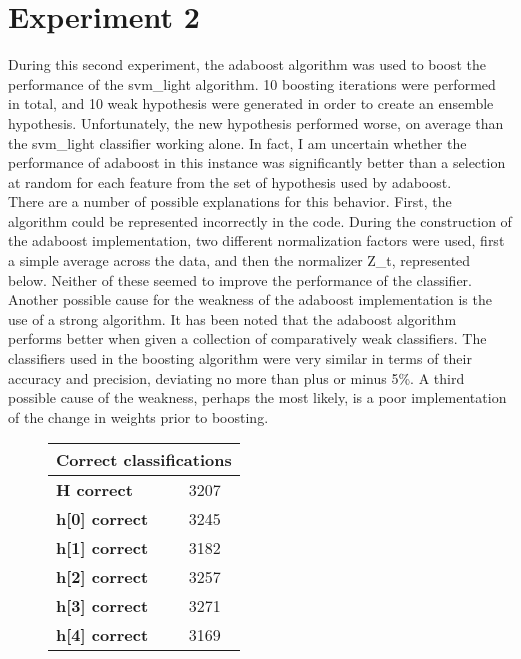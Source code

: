 \documentclass[titlepage,11pt]{article}
\begin{document}
\section[5]{Experiment 2} {
\vspace{2pt} \hspace{2pt}During this second experiment, the adaboost algorithm was used to boost the performance of the svm\_light algorithm. 10 boosting iterations were performed in total, and 10 weak hypothesis were generated in order to create an ensemble hypothesis. Unfortunately, the new hypothesis performed worse, on average than the svm\_light classifier working alone. In fact, I am uncertain whether the performance of adaboost in this instance was significantly better than a selection at random for each feature from the set of hypothesis used by adaboost. \\
\vspace{2pt} \hspace{2pt}There are a number of possible explanations for this behavior. First, the algorithm could be represented incorrectly in the code. During the construction of the adaboost implementation, two different normalization factors were used, first a simple average across the data, and then the normalizer Z\_t, represented below. Neither of these seemed to improve the performance of the classifier. Another possible cause for the weakness of the adaboost implementation is the use of a strong algorithm. It has been noted that the adaboost algorithm performs better when given a collection of comparatively weak classifiers. The classifiers used in the boosting algorithm were very similar in terms of their accuracy and precision, deviating no more than plus or minus 5\%. A third possible cause of the weakness, perhaps the most likely, is a poor implementation of the change in weights prior to boosting. \\
\vspace{0.5pt}
\begin{figure}[h]
\begin{tabular}{|l|l|}
\hline
\multicolumn{2}{|c|}{\textbf{Correct classifications}}\\
\hline
\textbf{ H correct } & 3207 \\
\textbf{ h[0] correct } & 3245 \\
\textbf{ h[1] correct } & 3182 \\
\textbf{ h[2] correct } & 3257 \\
\textbf{ h[3] correct } & 3271 \\
\textbf{ h[4] correct } & 3169 \\

\end{tabular}
\end{figure}}
\end{document}
